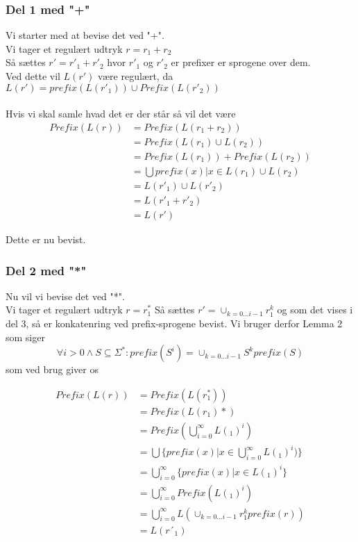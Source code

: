 \documentclass{article}
\begin{document}
\subsubsection*{Del 1 med "+"}
    Vi starter med at bevise det ved "+".\\
    Vi tager et regulært udtryk $r = r_1 + r_2$\\
    Så sættes $r' = r'_1 + r'_2$ hvor $r'_1$ og $r'_2$ er prefixer er sprogene over dem.\\
    Ved dette vil $L(r')$ være regulært, da $L(r') = prefix(L(r'_1)) \cup Prefix(L(r'_2))$\\
    \\
    Hvis vi skal samle hvad det er der står så vil det være
    \begin{equation*}
        \begin{split}
            Prefix(L(r)) &= Prefix(L(r_1 + r_2)) \\
            &= Prefix(L(r_1) \cup L(r_2)) \\
            &= Prefix(L(r_1)) +  Prefix(L(r_2)) \\
            &= \bigcup{prefix(x) | x \in L(r_1) \cup L(r_2)} \\
            &= L(r'_1) \cup L(r'_2) \\
            &= L(r'_1 + r'_2) \\
            &= L(r')
        \end{split}
    \end{equation*}
    
    
    Dette er nu bevist.

\subsubsection*{Del 2 med "*"}
    Nu vil vi bevise det ved "*".\\
    Vi tager et regulært udtryk $r=r_1^*$
    Så sættes $r' = \cup_{k=0...i-1}r_1^k$ og som det vises i del 3, så er konkatenring ved prefix-sprogene bevist.
    Vi bruger derfor Lemma 2 som siger $$\forall i>0 \wedge S \subseteq \Sigma^*: prefix(S^i) = \cup_{k = 0...i-1} S^kprefix(S)$$
    som ved brug giver os
    
    \begin{align*}
        Prefix(L(r)) &= Prefix(L(r_1^*)) \\
            &= Prefix(L(r_1)*) \\
            &= Prefix(\bigcup^{\infty}_{i=0}L(_1)^i) \\
            &= \bigcup\{prefix(x) | x \in \bigcup^{\infty}_{i=0}L(_1)^i)\} \\
            &= \bigcup^{\infty}_{i=0} \{prefix(x) | x \in L(_1)^i\} \\
            &= \bigcup^{\infty}_{i=0} Prefix(L(_1)^i) \\
            &= \bigcup^{\infty}_{i=0} L(\cup_{k = 0...i-1}r_1^kprefix(r))\\
            &= L(r´_1)
    \end{align*}
    
\end{document}
